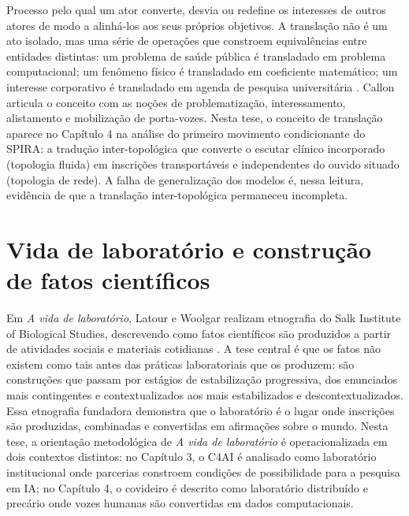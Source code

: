 \begin{description}
Processo pelo qual um ator converte, desvia ou redefine os interesses de outros atores de modo a alinhá-los aos seus próprios objetivos. A translação não é um ato isolado, mas uma série de operações que constroem equivalências entre entidades distintas: um problema de saúde pública é transladado em problema computacional; um fenômeno físico é transladado em coeficiente matemático; um interesse corporativo é transladado em agenda de pesquisa universitária \parencite{Latour2011CienciaEmAcao}. Callon articula o conceito com as noções de problematização, interessamento, alistamento e mobilização de porta-vozes. Nesta tese, o conceito de translação aparece no Capítulo 4 na análise do primeiro movimento condicionante do SPIRA: a tradução inter-topológica que converte o escutar clínico incorporado (topologia fluida) em inscrições transportáveis e independentes do ouvido situado (topologia de rede). A falha de generalização dos modelos é, nessa leitura, evidência de que a translação inter-topológica permaneceu incompleta.

\bigskip

\section*{Vida de laboratório e construção de fatos científicos}

Em \textit{A vida de laboratório}, Latour e Woolgar realizam etnografia do Salk Institute of Biological Studies, descrevendo como fatos científicos são produzidos a partir de atividades sociais e materiais cotidianas \parencite{Latour1997VidaLaboratorio}. A tese central é que os fatos não existem como tais antes das práticas laboratoriais que os produzem: são construções que passam por estágios de estabilização progressiva, dos enunciados mais contingentes e contextualizados aos mais estabilizados e descontextualizados. Essa etnografia fundadora demonstra que o laboratório é o lugar onde inscrições são produzidas, combinadas e convertidas em afirmações sobre o mundo. Nesta tese, a orientação metodológica de \textit{A vida de laboratório} é operacionalizada em dois contextos distintos: no Capítulo 3, o C4AI é analisado como laboratório institucional onde parcerias constroem condições de possibilidade para a pesquisa em IA; no Capítulo 4, o covideiro é descrito como laboratório distribuído e precário onde vozes humanas são convertidas em dados computacionais.


\end{description}
